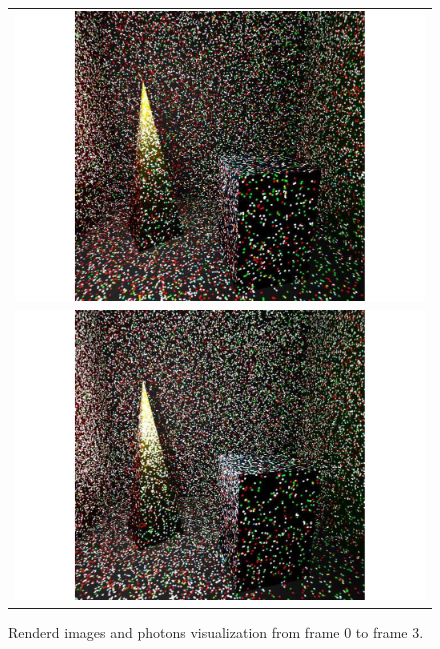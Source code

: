 \begin{figure}
\begin{center}
{\begin{tabular}{c}
\includegraphics*[scale=0.25]{imgs/pqv_frame2.pdf}\\
\includegraphics*[scale=0.25]{imgs/pqv_frame3.pdf}
\end{tabular}
}%
\caption{Renderd images and photons visualization from frame 0 to frame 3.}
\end{center}

\end{figure}

